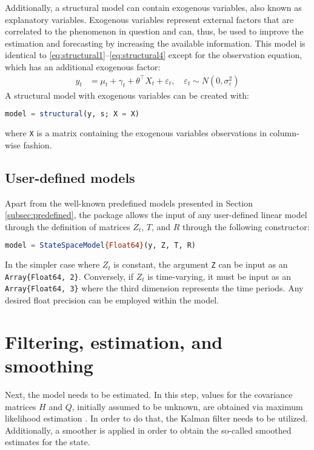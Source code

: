 \documentclass{juliacon}
\begin{document}
Additionally, a structural model can contain exogenous variables, also known as explanatory variables. Exogenous variables represent external factors that are correlated to the phenomenon in question and can, thus, be used to improve the estimation and forecasting by increasing the available information. This model is identical to \eqref{eq:structural1}--\eqref{eq:structural4} except for the observation equation, which has an additional exogenous factor:
%
\begin{align}
    y_{t} &= \mu_{t} + \gamma_{t} + \theta^{\top} X_{t} + \varepsilon_{t}, \quad \varepsilon_{t} \sim N(0, \sigma^{2}_\varepsilon) \label{eq:structural_exogenous}
\end{align}
%
A structural model with exogenous variables can be created with:
%
\begin{lstlisting}[language = Julia]
model = structural(y, s; X = X)
\end{lstlisting}
%
\noindent where \texttt{X} is a matrix containing the exogenous variables observations in column-wise fashion.

\subsection{User-defined models}

Apart from the well-known predefined models presented in Section \ref{subsec:predefined}, the package allows the input of any user-defined linear model through the definition of matrices $Z_{t}$, $T$, and $R$ through the following constructor:
%
\begin{lstlisting}[language = Julia]
model = StateSpaceModel{Float64}(y, Z, T, R)
\end{lstlisting}

In the simpler case where $Z_{t}$ is constant, the argument \texttt{Z} can be input as an \texttt{Array\{Float64, 2\}}. Conversely, if $Z_{t}$ is time-varying, it must be input as an \texttt{Array\{Float64, 3\}} where the third dimension represents the time periods. Any desired float precision can be employed within the model.

\section{Filtering, estimation, and smoothing} \label{sec:estimation}

Next, the model needs to be estimated. In this step, values for the covariance matrices $H$ and $Q$, initially assumed to be unknown, are obtained via maximum likelihood estimation \cite{casella2002statistical}. In order to do that, the Kalman filter needs to be utilized. Additionally, a smoother is applied in order to obtain the so-called smoothed estimates for the state.
\end{document}
